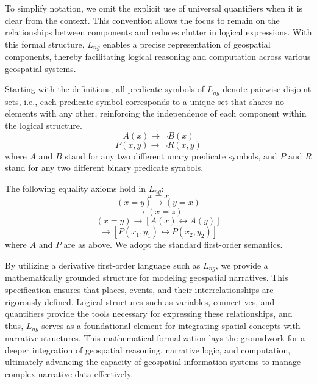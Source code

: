 To simplify notation, we omit the explicit use of universal quantifiers when it is clear from the context. This convention allows the focus to remain on the relationships between components and reduces clutter in logical expressions. With this formal structure, $L_{ng}$ enables a precise representation of geospatial components, thereby facilitating logical reasoning and computation across various geospatial systems.

Starting with the definitions, all predicate symbols of $L_{ng}$ denote pairwise disjoint sets, i.e., each predicate symbol corresponds to a unique set that shares no elements with any other, reinforcing the independence of each component within the logical structure.
\begin{equation}
A(x) \rightarrow \neg B(x)
\end{equation}
\begin{equation}
P(x, y) \rightarrow \neg R(x, y)
\end{equation}
where $A$ and $B$ stand for any two different unary predicate symbols, and $P$ and $R$ stand for any two different binary predicate symbols.

The following equality axioms hold in $L_{ng}$:
\begin{equation}
x = x
\end{equation}
\begin{equation}
(x = y) \rightarrow (y = x)
\end{equation}
\begin{equation}
[(x = y) \land (y = z)] \rightarrow (x = z)
\end{equation}
\begin{equation}
(x = y) \rightarrow [A(x) \leftrightarrow A(y)]
\end{equation}
\begin{equation}
[(x_1 = y_1) \land (x_2 = y_2)] \rightarrow [P(x_1, y_1) \leftrightarrow P(x_2, y_2)]
\end{equation}
where $A$ and $P$ are as above. We adopt the standard first-order semantics.

By utilizing a derivative first-order language such as $L_{ng}$, we provide a mathematically grounded structure for modeling geospatial narratives. This specification ensures that places, events, and their interrelationships are rigorously defined. Logical structures such as variables, connectives, and quantifiers provide the tools necessary for expressing these relationships, and thus, $L_{ng}$ serves as a foundational element for integrating spatial concepts with narrative structures. This mathematical formalization lays the groundwork for a deeper integration of geospatial reasoning, narrative logic, and computation, ultimately advancing the capacity of geospatial information systems to manage complex narrative data effectively.

